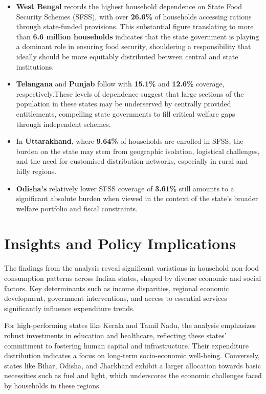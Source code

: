 \documentclass{article}
\begin{document}
\begin{itemize}[leftmargin=1.5em]
	
	\item \textbf{West Bengal} records the highest household dependence on State Food Security Schemes (SFSS), with over \textbf{26.6\%} of households accessing rations through state-funded provisions. This substantial figure translating to more than \textbf{6.6 million households} indicates that the state government is playing a dominant role in ensuring food security, shouldering a responsibility that ideally should be more equitably distributed between central and state institutions.
	
	\item \textbf{Telangana} and \textbf{Punjab} follow with \textbf{15.1\%} and \textbf{12.6\%} coverage, respectively.These levels of dependence suggest that large sections of the population in these states may be underserved by centrally provided entitlements, compelling state governments to fill critical welfare gaps through independent schemes.
	
	\item In \textbf{Uttarakhand}, where \textbf{9.64\%} of households are enrolled in SFSS, the burden on the state may stem from geographic isolation, logistical challenges, and the need for customised distribution networks, especially in rural and hilly regions.
	
	\item \textbf{Odisha’s} relatively lower SFSS coverage of \textbf{3.61\%} still amounts to a significant absolute burden when viewed in the context of the state's broader welfare portfolio and fiscal constraints.
	
\end{itemize}





	\section{Insights and Policy Implications}
	The findings from the analysis reveal significant variations in household non-food consumption patterns across Indian states, shaped by diverse economic and social factors. Key determinants such as income disparities, regional economic development, government interventions, and access to essential services significantly influence expenditure trends.
	
	For high-performing states like Kerala and Tamil Nadu, the analysis emphasizes robust investments in education and healthcare, reflecting these states' commitment to fostering human capital and infrastructure. Their expenditure distribution indicates a focus on long-term socio-economic well-being. Conversely, states like Bihar, Odisha, and Jharkhand exhibit a larger allocation towards basic necessities such as fuel and light, which underscores the economic challenges faced by households in these regions.
	
\end{document}
